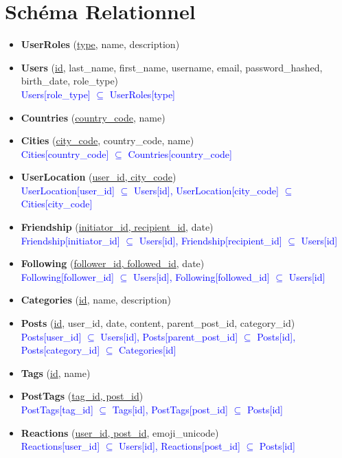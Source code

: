 \section{Schéma Relationnel}

\begin{itemize}[label={},left=0pt]
    \item \textbf{UserRoles} (\underline{type}, name, description)
    \item \textbf{Users} (\underline{id}, last\_name, first\_name, username, email, password\_hashed, birth\_date, role\_type) \\
    \textcolor{blue}{Users[role\_type] $\subseteq$ UserRoles[type]}

    \item \textbf{Countries} (\underline{country\_code}, name)
    \item \textbf{Cities} (\underline{city\_code}, country\_code, name) \\
    \textcolor{blue}{Cities[country\_code] $\subseteq$ Countries[country\_code]}
    \item \textbf{UserLocation} (\underline{user\_id, city\_code}) \\
    \textcolor{blue}{UserLocation[user\_id] $\subseteq$ Users[id], UserLocation[city\_code] $\subseteq$ Cities[city\_code]}

    \item \textbf{Friendship} (\underline{initiator\_id, recipient\_id}, date) \\
    \textcolor{blue}{Friendship[initiator\_id] $\subseteq$ Users[id], Friendship[recipient\_id] $\subseteq$ Users[id]}
    \item \textbf{Following} (\underline{follower\_id, followed\_id}, date) \\
    \textcolor{blue}{Following[follower\_id] $\subseteq$ Users[id], Following[followed\_id] $\subseteq$ Users[id]}

    \item \textbf{Categories} (\underline{id}, name, description)
    
    \item \textbf{Posts} (\underline{id}, user\_id, date, content, parent\_post\_id, category\_id) \\
    \textcolor{blue}{Posts[user\_id] $\subseteq$ Users[id], Posts[parent\_post\_id] $\subseteq$ Posts[id], Posts[category\_id] $\subseteq$ Categories[id]}
    \item \textbf{Tags} (\underline{id}, name)
    \item \textbf{PostTags} (\underline{tag\_id, post\_id}) \\
    \textcolor{blue}{PostTags[tag\_id] $\subseteq$ Tags[id], PostTags[post\_id] $\subseteq$ Posts[id]}
    \item \textbf{Reactions} (\underline{user\_id, post\_id}, emoji\_unicode) \\
    \textcolor{blue}{Reactions[user\_id] $\subseteq$ Users[id], Reactions[post\_id] $\subseteq$ Posts[id]}


\end{itemize}
